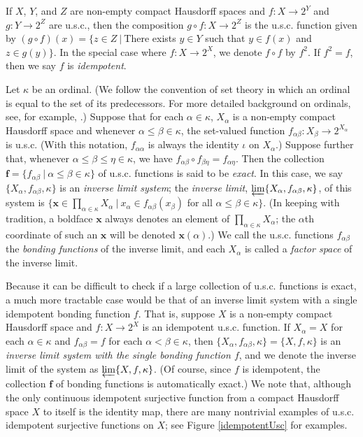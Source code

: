 \documentclass{amsart}
\theoremstyle{definition}
\begin{document}
If $X$, $Y$, and $Z$ are non-empty compact Hausdorff spaces and $f : X \rightarrow 2^{Y}$ and $g: Y \rightarrow 2^{Z}$ are u.s.c., then the composition $g \circ f : X \rightarrow 2^{Z}$ is the u.s.c. function given by $(g \circ f)(x) = \{z \in Z \ | \ $There exists $y \in Y$ such that $y \in f(x)$ and $z \in g(y)\}$. In the special case where $f: X \rightarrow 2^{X}$, we denote $f \circ f$ by $f^2$. If $f^2 = f$, then we say $f$ is \emph{idempotent}.

Let $\kappa$ be an ordinal. (We follow the convention of set theory in which an ordinal is equal to the set of its predecessors. For more detailed background on ordinals, see, for example, \cite{Kunen}.) Suppose that for each $\alpha \in \kappa$, $X_{\alpha}$ is a non-empty compact Hausdorff space and whenever $\alpha \le \beta \in \kappa$, the set-valued function $f_{\alpha \beta} : X_{\beta} \rightarrow 2^{X_{\alpha}}$ is u.s.c. (With this notation, $f_{\alpha \alpha}$ is always the identity $\iota$ on $X_{\alpha}$.) Suppose further that, whenever $\alpha \le \beta \le \eta \in \kappa$, we have $f_{\alpha \beta} \circ f_{\beta \eta} = f_{\alpha \eta}$. Then the collection $\textbf{f} = \{ f_{\alpha \beta} \ | \ \alpha \le \beta \in \kappa\}$ of u.s.c. functions is said to be \emph{exact}. In this case, we say $\{X_{\alpha}, f_{\alpha \beta}, \kappa\}$ is an \emph{inverse limit system}; the \emph{inverse limit}, $\varprojlim \{X_{\alpha}, f_{\alpha \beta}, \kappa\}$, of this system is $\{ \textbf{x} \in \prod_{\alpha \in \kappa} X_{\alpha} \ | \ x_{\alpha} \in f_{\alpha \beta}(x_{\beta})$ for all $\alpha \le \beta \in \kappa\}$. (In keeping with tradition, a boldface $\textbf{x}$ always denotes an element of $\prod_{\alpha \in \kappa} X_{\alpha}$; the $\alpha$th coordinate of such an $\textbf{x}$ will be denoted $\textbf{x}(\alpha)$.)  We call the u.s.c. functions $f_{\alpha \beta}$ the \emph{bonding functions} of the inverse limit, and each $X_{\alpha}$ is called a \emph{factor space} of the inverse limit.

Because it can be difficult to check if a large collection of u.s.c. functions is exact, a much more tractable case would be that of an inverse limit system with a single idempotent bonding function $f$. That is, suppose $X$ is a non-empty compact Hausdorff space and $f: X \rightarrow 2^{X}$ is an idempotent u.s.c. function. If $X_{\alpha} = X$ for each $\alpha \in \kappa$ and $f_{\alpha \beta} = f$ for each $\alpha < \beta \in \kappa$, then $\{X_{\alpha}, f_{\alpha \beta}, \kappa\} = \{X, f, \kappa\}$ is an \emph{inverse limit system with the single bonding function $f$}, and we denote the inverse limit of the system as $\varprojlim \{X, f, \kappa\}$. (Of course, since $f$ is idempotent, the collection $\textbf{f}$ of bonding functions is automatically exact.) We note that, although the only continuous idempotent surjective function from a compact Hausdorff space $X$ to itself is the identity map, there are many nontrivial examples of u.s.c. idempotent surjective functions on $X$; see Figure \ref{idempotentUsc} for examples.
\end{document}

